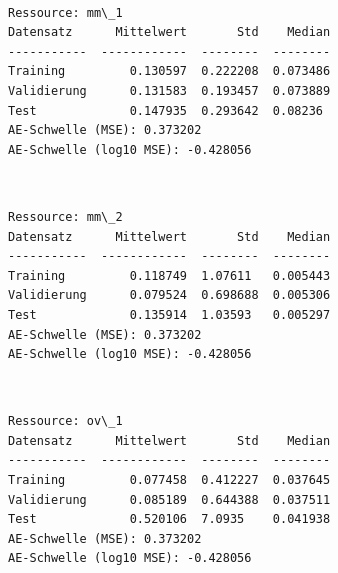 \documentclass[11pt]{article}
\begin{document}
    \begin{center}
    \end{center}
    { \hspace*{\fill} \\}
    
    \begin{Verbatim}[commandchars=\\\{\}]
Ressource: mm\_1
Datensatz      Mittelwert       Std    Median
-----------  ------------  --------  --------
Training         0.130597  0.222208  0.073486
Validierung      0.131583  0.193457  0.073889
Test             0.147935  0.293642  0.08236
AE-Schwelle (MSE): 0.373202
AE-Schwelle (log10 MSE): -0.428056

    \end{Verbatim}

    \begin{center}
    \end{center}
    { \hspace*{\fill} \\}
    
    \begin{Verbatim}[commandchars=\\\{\}]
Ressource: mm\_2
Datensatz      Mittelwert       Std    Median
-----------  ------------  --------  --------
Training         0.118749  1.07611   0.005443
Validierung      0.079524  0.698688  0.005306
Test             0.135914  1.03593   0.005297
AE-Schwelle (MSE): 0.373202
AE-Schwelle (log10 MSE): -0.428056

    \end{Verbatim}

    \begin{center}
    \end{center}
    { \hspace*{\fill} \\}
    
    \begin{Verbatim}[commandchars=\\\{\}]
Ressource: ov\_1
Datensatz      Mittelwert       Std    Median
-----------  ------------  --------  --------
Training         0.077458  0.412227  0.037645
Validierung      0.085189  0.644388  0.037511
Test             0.520106  7.0935    0.041938
AE-Schwelle (MSE): 0.373202
AE-Schwelle (log10 MSE): -0.428056

    \end{Verbatim}
\end{document}
